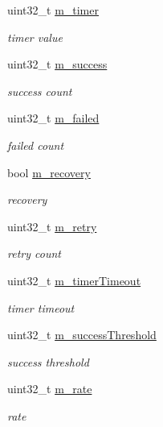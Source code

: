 \begin{DoxyCompactItemize}
\item 
uint32\+\_\+t \hyperlink{structns3_1_1ArfWifiRemoteStation_a14623ad40579f150f8b7e98c83208ce7}{m\+\_\+timer}
\begin{DoxyCompactList}\small\item\em timer value \end{DoxyCompactList}\item 
uint32\+\_\+t \hyperlink{structns3_1_1ArfWifiRemoteStation_afec8673d7ab25c88e63fc9bc725a29ea}{m\+\_\+success}
\begin{DoxyCompactList}\small\item\em success count \end{DoxyCompactList}\item 
uint32\+\_\+t \hyperlink{structns3_1_1ArfWifiRemoteStation_a9b6449bdc757730b6e45cc2b3bec6929}{m\+\_\+failed}
\begin{DoxyCompactList}\small\item\em failed count \end{DoxyCompactList}\item 
bool \hyperlink{structns3_1_1ArfWifiRemoteStation_a9a6b4c7cb9d2ab847e52ad0cd4c3b1f6}{m\+\_\+recovery}
\begin{DoxyCompactList}\small\item\em recovery \end{DoxyCompactList}\item 
uint32\+\_\+t \hyperlink{structns3_1_1ArfWifiRemoteStation_a835be8f21db1619f76beb90bd1e16ac2}{m\+\_\+retry}
\begin{DoxyCompactList}\small\item\em retry count \end{DoxyCompactList}\item 
uint32\+\_\+t \hyperlink{structns3_1_1ArfWifiRemoteStation_a9d215b79b4d6e566c2269b3c0f9807fc}{m\+\_\+timer\+Timeout}
\begin{DoxyCompactList}\small\item\em timer timeout \end{DoxyCompactList}\item 
uint32\+\_\+t \hyperlink{structns3_1_1ArfWifiRemoteStation_abdbbe7ba0558edd08e69c4b783c4de41}{m\+\_\+success\+Threshold}
\begin{DoxyCompactList}\small\item\em success threshold \end{DoxyCompactList}\item 
uint32\+\_\+t \hyperlink{structns3_1_1ArfWifiRemoteStation_a0db99222ec1bbe4ab7222968b9bf2eb3}{m\+\_\+rate}
\begin{DoxyCompactList}\small\item\em rate \end{DoxyCompactList}\end{DoxyCompactItemize}
